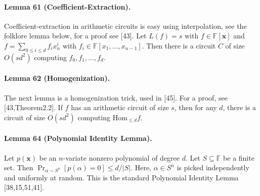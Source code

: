\paragraph{Lemma 61 (Coefficient-Extraction).} Coefficient-extraction in arithmetic circuits is easy using interpolation, see the folklore lemma below, for a proof see [43]. Let $L(f)=s$ with $f\in\mathbb F[\mathbf x]$ and $f=\sum_{0\le i\le d}f_ix_n^i$ with $f_i\in\mathbb F[x_1,\ldots,x_{n-1}]$. Then there is a circuit $C$ of size $O(sd^2)$ computing $f_0,f_1,\ldots,f_d$.
\paragraph{Lemma 62 (Homogenization).} The next lemma is a homogenization trick, used in [45]. For a proof, see [43,Theorem2.2]. If $f$ has an arithmetic circuit of size $s$, then for any $d$, there is a circuit of size $O(sd^2)$ computing $\mathrm{Hom}_{\le d}f$.
\paragraph{Lemma 64 (Polynomial Identity Lemma).} Let $p(\mathbf x)$ be an $n$-variate nonzero polynomial of degree $d$. Let $S\subseteq\mathbb F$ be a finite set. Then $\Pr_{\alpha\sim S^n}[p(\alpha)=0]\le d/|S|$. Here, $\alpha\in S^n$ is picked independently and uniformly at random. This is the standard Polynomial Identity Lemma [38,15,51,41].
